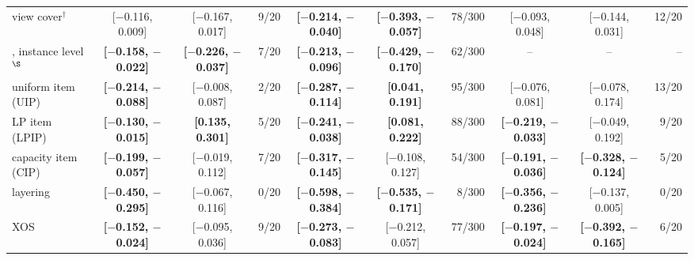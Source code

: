 \begin{table}[t]
\begin{tabular}{@{}lccrccrccr@{}}
    \querymarket{} view cover$^{\dagger}$ & [$-$0.116, 0.009] & [$-$0.167, 0.017] & 9/20 & \textbf{[$-$0.214, $-$0.040]} & \textbf{[$-$0.393, $-$0.057]} & 78/300 & [$-$0.093, 0.048] & [$-$0.144, 0.031] & 12/20 \\
    \querymarket{}, instance level$^{\S}$ & \textbf{[$-$0.158, $-$0.022]} & \textbf{[$-$0.226, $-$0.037]} & 7/20 & \textbf{[$-$0.213, $-$0.096]} & \textbf{[$-$0.429, $-$0.170]} & 62/300 & -- & -- & -- \\
    \midrule
    uniform item (UIP) & \textbf{[$-$0.214, $-$0.088]} & [$-$0.008, 0.087] & 2/20 & \textbf{[$-$0.287, $-$0.114]} & \textbf{[0.041, 0.191]} & 95/300 & [$-$0.076, 0.081] & [$-$0.078, 0.174] & 13/20 \\
    LP item (LPIP) & \textbf{[$-$0.130, $-$0.015]} & \textbf{[0.135, 0.301]} & 5/20 & \textbf{[$-$0.241, $-$0.038]} & \textbf{[0.081, 0.222]} & 88/300 & \textbf{[$-$0.219, $-$0.033]} & [$-$0.049, 0.192] & 9/20 \\
    capacity item (CIP) & \textbf{[$-$0.199, $-$0.057]} & [$-$0.019, 0.112] & 7/20 & \textbf{[$-$0.317, $-$0.145]} & [$-$0.108, 0.127] & 54/300 & \textbf{[$-$0.191, $-$0.036]} & \textbf{[$-$0.328, $-$0.124]} & 5/20 \\
    layering & \textbf{[$-$0.450, $-$0.295]} & [$-$0.067, 0.116] & 0/20 & \textbf{[$-$0.598, $-$0.384]} & \textbf{[$-$0.535, $-$0.171]} & 8/300 & \textbf{[$-$0.356, $-$0.236]} & [$-$0.137, 0.005] & 0/20 \\
    XOS & \textbf{[$-$0.152, $-$0.024]} & [$-$0.095, 0.036] & 9/20 & \textbf{[$-$0.273, $-$0.083]} & [$-$0.212, 0.057] & 77/300 & \textbf{[$-$0.197, $-$0.024]} & \textbf{[$-$0.392, $-$0.165]} & 6/20 \\
    \bottomrule
  \end{tabular}
\end{table}

